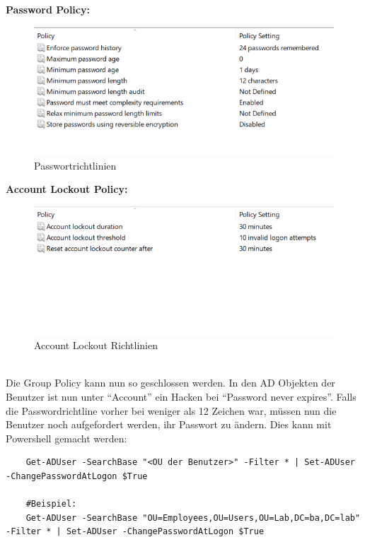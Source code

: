 \begin{minipage}{0.5\linewidth}
    \textbf{Password Policy:}
    \begin{figure}[H]
        \centering
        \includegraphics[width=\linewidth]{../img/IAM/default-password-policy.png}
        \caption{Passwortrichtlinien}
    \end{figure}
\end{minipage}
\begin{minipage}{0.5\linewidth}
    \textbf{Account Lockout Policy:}
    \begin{figure}[H]
        \centering
        \includegraphics[width=\linewidth]{../img/IAM/account-lockout-policy.png}
        \caption{Account Lockout Richtlinien}
    \end{figure}
\end{minipage}\\

Die Group Policy kann nun so geschlossen werden.
In den AD Objekten der Benutzer ist nun unter ``Account'' ein Hacken bei ``Password never expires''.
Falls die Passwordrichtline vorher bei weniger als 12 Zeichen war, müssen nun die Benutzer noch aufgefordert werden, ihr Passwort zu ändern.
Dies kann mit Powershell gemacht werden:
\begin{lstlisting}
    Get-ADUser -SearchBase "<OU der Benutzer>" -Filter * | Set-ADUser -ChangePasswordAtLogon $True

    #Beispiel:
    Get-ADUser -SearchBase "OU=Employees,OU=Users,OU=Lab,DC=ba,DC=lab" -Filter * | Set-ADUser -ChangePasswordAtLogon $True
\end{lstlisting}

